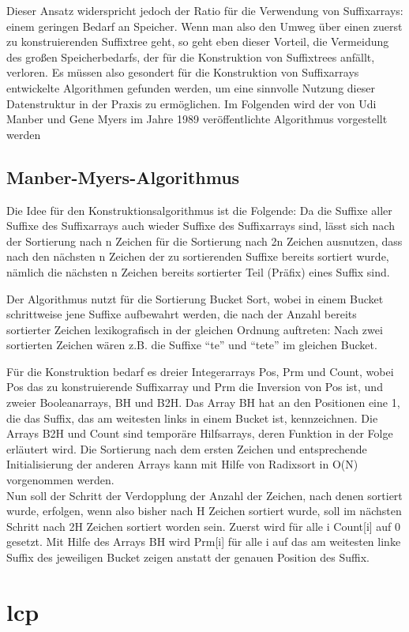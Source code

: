 \documentclass[twoside]{article}
\begin{document}
Dieser Ansatz widerspricht jedoch der Ratio für die Verwendung von Suffixarrays:
einem geringen Bedarf an Speicher.
Wenn man also den Umweg über einen zuerst zu konstruierenden Suffixtree geht, so
geht eben dieser Vorteil, die Vermeidung des großen Speicherbedarfs, der für die
Konstruktion von Suffixtrees anfällt, verloren.
Es müssen also gesondert für die Konstruktion von Suffixarrays entwickelte
Algorithmen gefunden werden, um eine sinnvolle Nutzung dieser Datenstruktur in
der Praxis zu ermöglichen.
Im Folgenden wird der von Udi Manber und Gene Myers im Jahre 1989 veröffentlichte
Algorithmus vorgestellt werden

\subsection{Manber-Myers-Algorithmus}
Die Idee für den Konstruktionsalgorithmus ist die Folgende: Da die Suffixe aller
Suffixe des Suffixarrays auch wieder Suffixe des Suffixarrays sind, lässt sich
nach der Sortierung nach n Zeichen für die Sortierung nach 2n Zeichen ausnutzen,
dass nach den nächsten n Zeichen der zu sortierenden Suffixe bereits sortiert
wurde, nämlich die nächsten n Zeichen bereits sortierter Teil (Präfix) eines Suffix
sind.

Der Algorithmus nutzt für die Sortierung Bucket Sort, wobei in einem Bucket schrittweise
jene Suffixe aufbewahrt werden, die nach der Anzahl bereits sortierter Zeichen
lexikografisch in der gleichen Ordnung auftreten: Nach zwei sortierten Zeichen
wären z.B. die Suffixe "`te"' und "`tete"' im gleichen Bucket.

Für die Konstruktion bedarf es dreier Integerarrays Pos, Prm und Count, wobei Pos das
zu konstruierende Suffixarray und Prm die Inversion von Pos ist, und zweier
Booleanarrays, BH und B2H. Das Array BH hat an den Positionen eine 1, die das Suffix, das
am weitesten links in einem Bucket ist, kennzeichnen. Die Arrays B2H und Count
sind temporäre Hilfsarrays, deren Funktion in der Folge erläutert wird.
Die Sortierung nach dem ersten
Zeichen und entsprechende Initialisierung der anderen Arrays kann mit Hilfe
von Radixsort in O(N) vorgenommen werden. \\


Nun soll der Schritt der Verdopplung der Anzahl der Zeichen, nach denen sortiert
wurde, erfolgen, wenn also bisher nach H Zeichen sortiert wurde, soll im nächsten
Schritt nach 2H Zeichen sortiert worden sein.
Zuerst wird für alle i Count[i] auf 0 gesetzt. Mit Hilfe des Arrays BH wird Prm[i]
für alle i auf das am weitesten linke Suffix des jeweiligen Bucket zeigen anstatt
der genauen Position des Suffix.


\section{lcp}


\end{document}
